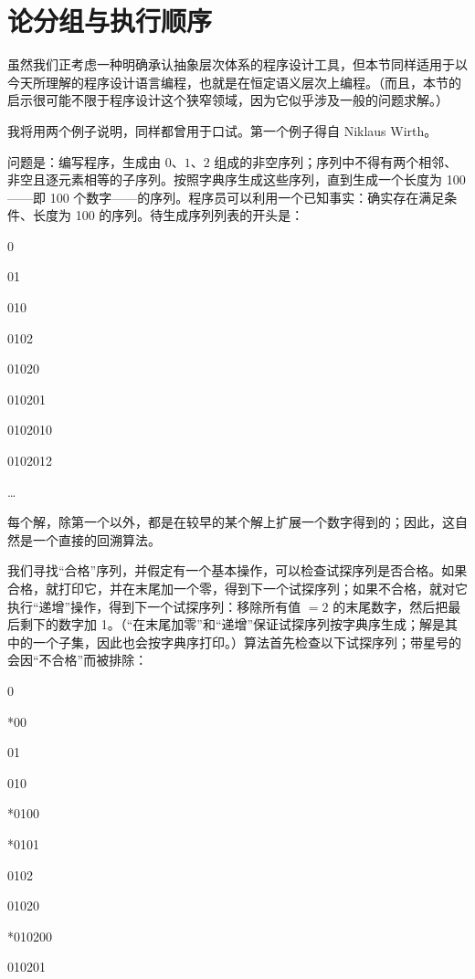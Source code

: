 \documentclass[twoside,11pt,fontset=none]{ctexbook}
\begin{document}
\section[论分组与执行顺序]{论分组与执行顺序}
\label{sec:grouping-and-sequencing}

虽然我们正考虑一种明确承认抽象层次体系的程序设计工具，但本节同样适用于以今天所理解的程序设计语言编程，也就是在恒定语义层次上编程。（而且，本节的启示很可能不限于程序设计这个狭窄领域，因为它似乎涉及一般的问题求解。）

我将用两个例子说明，同样都曾用于口试。第一个例子得自 Niklaus Wirth。

问题是：编写程序，生成由 $0$、$1$、$2$ 组成的非空序列；序列中不得有两个相邻、非空且逐元素相等的子序列。按照字典序生成这些序列，直到生成一个长度为 100——即 100 个数字——的序列。程序员可以利用一个已知事实：确实存在满足条件、长度为 100 的序列。待生成序列列表的开头是：

0

01

010

0102

01020

010201

0102010

0102012

\dots

每个解，除第一个以外，都是在较早的某个解上扩展一个数字得到的；因此，这自然是一个直接的回溯算法。

我们寻找“合格”序列，并假定有一个基本操作，可以检查试探序列是否合格。如果合格，就打印它，并在末尾加一个零，得到下一个试探序列；如果不合格，就对它执行“递增”操作，得到下一个试探序列：移除所有值 $= 2$ 的末尾数字，然后把最后剩下的数字加 1。（“在末尾加零”和“递增”保证试探序列按字典序生成；解是其中的一个子集，因此也会按字典序打印。）算法首先检查以下试探序列；带星号的会因“不合格”而被排除：

\noindent
\tabto{\parindent}0

\noindent
*\tabto{\parindent}00

\noindent
\tabto{\parindent}01

\noindent
\tabto{\parindent}010

\noindent
*\tabto{\parindent}0100

\noindent
*\tabto{\parindent}0101

\noindent
\tabto{\parindent}0102

\noindent
\tabto{\parindent}01020

\noindent
*\tabto{\parindent}010200

\noindent
\tabto{\parindent}010201
\end{document}
